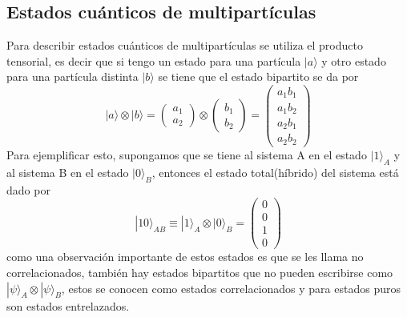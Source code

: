 \documentclass[a4paper]{article}
\begin{document}
\subsection{Estados cuánticos de multipartículas}
Para describir estados cuánticos de multipartículas se utiliza el producto tensorial, es decir que si tengo un estado para una partícula $|a\rangle$ y otro estado para una partícula distinta $|b\rangle$ se tiene que el estado bipartito se da por
\begin{equation}
|a\rangle \otimes |b\rangle=
	\begin{pmatrix}
		a_1 \\
		a_2
	\end{pmatrix}\otimes
	\begin{pmatrix}
		b_1 \\
		b_2
	\end{pmatrix}=
	\begin{pmatrix}
		a_1 b_1 \\
		a_1 b_2 \\
		a_2 b_1 \\
		a_2 b_2 
	\end{pmatrix}
\end{equation}
Para ejemplificar esto, supongamos que se tiene al sistema A en el estado $|1\rangle_A$ y al sistema B en el estado $|0\rangle_B$, entonces el estado total(híbrido) del sistema está dado por
\begin{equation}
|10\rangle_{AB}\equiv |1\rangle_A\otimes |0\rangle_B=
	\begin{pmatrix}
		0 \\
		0\\
		1\\
		0
	\end{pmatrix}	
\end{equation}
como una observación importante de estos estados es que se les llama no correlacionados, también hay estados bipartitos que no pueden escribirse como $|\psi\rangle_A\otimes|\psi\rangle_B$, estos se conocen como estados correlacionados y para estados puros son estados entrelazados.\\
\end{document}
